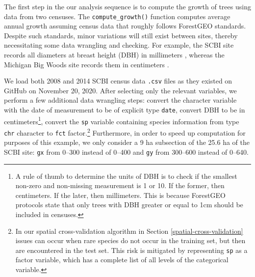 \documentclass[12pt]{article}
\begin{document}
The first step in the our analysis sequence is to compute the growth of
trees using data from two censuses. The \texttt{compute\_growth()}
function computes average annual growth assuming census data that
roughly follows ForestGEO standards. Despite such standards, minor
variations will still exist between sites, thereby necessitating some
data wrangling and checking. For example, the SCBI site records all
diameters at breast height (DBH) in millimeters
\citep{bourg_initial_2013}, whereas the Michigan Big Woods site records
them in centimeters \citep{allen_michigan_2020}.

We load both 2008 and 2014 SCBI census data \texttt{.csv} files as they
existed on GitHub on November 20, 2020. After selecting only the
relevant variables, we perform a few additional data wrangling steps:
convert the character variable with the date of measurement to be of
explicit type \texttt{date}, convert DBH to be in centimeters\footnote{A
  rule of thumb to determine the units of DBH is to check if the
  smallest non-zero and non-missing measurement is 1 or 10. If the
  former, then centimeters. If the later, then millimeters. This is
  because ForestGEO protocols state that only trees with DBH greater or
  equal to 1cm should be included in censuses.}, convert the \texttt{sp}
variable containing species information from type \texttt{chr} character
to \texttt{fct} factor.\footnote{In our spatial cross-validation
  algorithm in Section \ref{spatial-cross-validation} issues can occur
  when rare species do not occur in the training set, but then are
  encountered in the test set. This risk is mitigated by representing
  \texttt{sp} as a factor variable, which has a complete list of all
  levels of the categorical variable.} Furthermore, in order to speed up
computation for purposes of this example, we only consider a 9 ha
subsection of the 25.6 ha of the SCBI site: \texttt{gx} from 0--300
instead of 0--400 and \texttt{gy} from 300--600 instead of 0--640.
\end{document}
